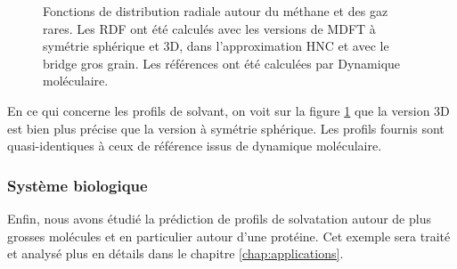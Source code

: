 \begin{figure}[H]
\begin{subfigure}{.5\textwidth}
{
    }
  \end{subfigure}
  \caption[Fonctions de distribution radiale autour du méthane et des gaz rares en 3D.]{ Fonctions de distribution radiale autour du méthane et des gaz rares. Les RDF ont été calculés avec les versions de MDFT à symétrie sphérique et 3D, dans l'approximation HNC et avec le bridge gros grain. Les références ont été calculées par Dynamique moléculaire.}
    \label{fig:g_of_r_methane_3D}
\end{figure}


En ce qui concerne les profils de solvant, on voit sur la figure \ref{fig:g_of_r_methane_3D} que la version 3D est bien plus précise que la version à symétrie sphérique. Les profils fournis sont quasi-identiques à ceux de référence issus de dynamique moléculaire.



\subsubsection{Système biologique}

Enfin, nous avons étudié la prédiction de profils de solvatation autour de plus grosses molécules et en particulier autour d'une protéine. Cet exemple sera traité et analysé plus en détails dans le chapitre \ref{chap:applications}.








